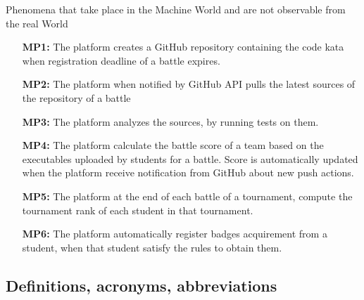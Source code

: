 \documentclass{article}
\newcounter{subsubsubsection}[subsubsection]
\begin{document}
Phenomena that take place in the Machine World and are not observable from the real World
\begin{enumerate}
    \item[\textbf{MP1:}] The platform creates a GitHub repository containing the code kata when registration deadline of a battle expires.
    \item[\textbf{MP2:}] The platform when notified by GitHub API pulls the latest sources of the repository of a battle
    \item[\textbf{MP3:}] The platform analyzes the sources, by running tests on them.
    \item[\textbf{MP4:}] The platform calculate the battle score of a team based on the executables uploaded by students for a battle. Score is automatically updated when the platform receive notification from GitHub about new push actions.
    \item[\textbf{MP5:}] The platform at the end of each battle of a tournament, compute the tournament rank of each student in that tournament.
    \item[\textbf{MP6:}] The platform automatically register badges acquirement from a student, when that student satisfy the rules to obtain them.
\end{enumerate}


\subsection{Definitions, acronyms, abbreviations}
\end{document}
